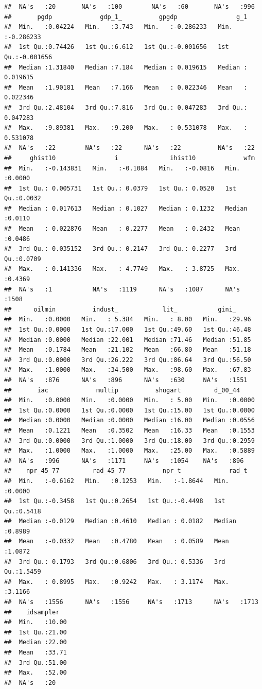 \documentclass[]{book}
\begin{document}
\begin{verbatim}
##  NA's   :20       NA's   :100        NA's   :60       NA's   :996      
##       pgdp             gdp_1_          gpgdp                g_1           
##  Min.   :0.04224   Min.   :3.743   Min.   :-0.286233   Min.   :-0.286233  
##  1st Qu.:0.74426   1st Qu.:6.612   1st Qu.:-0.001656   1st Qu.:-0.001656  
##  Median :1.31840   Median :7.184   Median : 0.019615   Median : 0.019615  
##  Mean   :1.90181   Mean   :7.166   Mean   : 0.022346   Mean   : 0.022346  
##  3rd Qu.:2.48104   3rd Qu.:7.816   3rd Qu.: 0.047283   3rd Qu.: 0.047283  
##  Max.   :9.89381   Max.   :9.200   Max.   : 0.531078   Max.   : 0.531078  
##  NA's   :22        NA's   :22      NA's   :22          NA's   :22         
##     ghist10                i              ihist10             wfm        
##  Min.   :-0.143831   Min.   :-0.1084   Min.   :-0.0816   Min.   :0.0000  
##  1st Qu.: 0.005731   1st Qu.: 0.0379   1st Qu.: 0.0520   1st Qu.:0.0032  
##  Median : 0.017613   Median : 0.1027   Median : 0.1232   Median :0.0110  
##  Mean   : 0.022876   Mean   : 0.2277   Mean   : 0.2432   Mean   :0.0486  
##  3rd Qu.: 0.035152   3rd Qu.: 0.2147   3rd Qu.: 0.2277   3rd Qu.:0.0709  
##  Max.   : 0.141336   Max.   : 4.7749   Max.   : 3.8725   Max.   :0.4369  
##  NA's   :1           NA's   :1119      NA's   :1087      NA's   :1508    
##      oilmin          indust_            lit_           gini_      
##  Min.   :0.0000   Min.   : 5.384   Min.   : 8.00   Min.   :29.96  
##  1st Qu.:0.0000   1st Qu.:17.000   1st Qu.:49.60   1st Qu.:46.48  
##  Median :0.0000   Median :22.001   Median :71.46   Median :51.85  
##  Mean   :0.1784   Mean   :21.102   Mean   :66.80   Mean   :51.18  
##  3rd Qu.:0.0000   3rd Qu.:26.222   3rd Qu.:86.64   3rd Qu.:56.50  
##  Max.   :1.0000   Max.   :34.500   Max.   :98.60   Max.   :67.83  
##  NA's   :876      NA's   :896      NA's   :630     NA's   :1551   
##       iac             multip          shugart         d_00_44      
##  Min.   :0.0000   Min.   :0.0000   Min.   : 5.00   Min.   :0.0000  
##  1st Qu.:0.0000   1st Qu.:0.0000   1st Qu.:15.00   1st Qu.:0.0000  
##  Median :0.0000   Median :0.0000   Median :16.00   Median :0.0556  
##  Mean   :0.1221   Mean   :0.3502   Mean   :16.33   Mean   :0.1553  
##  3rd Qu.:0.0000   3rd Qu.:1.0000   3rd Qu.:18.00   3rd Qu.:0.2959  
##  Max.   :1.0000   Max.   :1.0000   Max.   :25.00   Max.   :0.5889  
##  NA's   :996      NA's   :1171     NA's   :1054    NA's   :896     
##    npr_45_77         rad_45_77          npr_t             rad_t       
##  Min.   :-0.6162   Min.   :0.1253   Min.   :-1.8644   Min.   :0.0000  
##  1st Qu.:-0.3458   1st Qu.:0.2654   1st Qu.:-0.4498   1st Qu.:0.5418  
##  Median :-0.0129   Median :0.4610   Median : 0.0182   Median :0.8989  
##  Mean   :-0.0332   Mean   :0.4780   Mean   : 0.0589   Mean   :1.0872  
##  3rd Qu.: 0.1793   3rd Qu.:0.6806   3rd Qu.: 0.5336   3rd Qu.:1.5459  
##  Max.   : 0.8995   Max.   :0.9242   Max.   : 3.1174   Max.   :3.1166  
##  NA's   :1556      NA's   :1556     NA's   :1713      NA's   :1713    
##    idsampler    
##  Min.   :10.00  
##  1st Qu.:21.00  
##  Median :22.00  
##  Mean   :33.71  
##  3rd Qu.:51.00  
##  Max.   :52.00  
##  NA's   :20
\end{verbatim}
\end{document}

